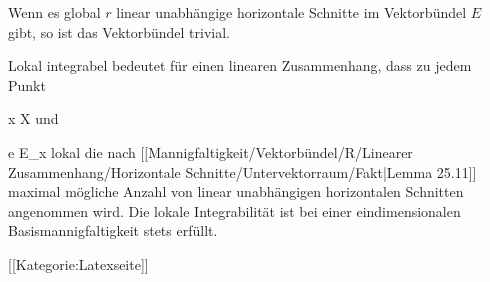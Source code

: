 Wenn es global
 {} {}
$r$ linear unabhängige horizontale Schnitte im Vektorbündel $E$  gibt, so ist das Vektorbündel trivial.

Lokal integrabel bedeutet für einen linearen Zusammenhang, dass zu jedem Punkt

\mavergleichskette
{\vergleichskette
{ x
}
{ \in }{ X
}
{  }{
}
{    }{
}
{   }{
}
}
{}{}{}
und

\mavergleichskette
{\vergleichskette
{ e
}
{ \in }{ E_x
}
{  }{
}
{    }{
}
{   }{
}
}
{}{}{}
lokal
 {} {}
die nach
[[Mannigfaltigkeit/Vektorbündel/R/Linearer Zusammenhang/Horizontale Schnitte/Untervektorraum/Fakt|Lemma 25.11]]
maximal mögliche Anzahl
 {} {}
von linear unabhängigen horizontalen Schnitten angenommen wird. Die lokale Integrabilität ist bei einer eindimensionalen Basismannigfaltigkeit stets erfüllt.

 [[Kategorie:Latexseite]]
